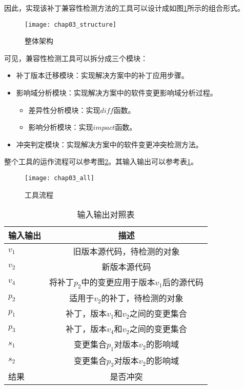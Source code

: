 因此，实现该补丁兼容性检测方法的工具可以设计成如图\ref {structure}所示的组合形式。

\begin{figure}[H]
	\centering
	\texttt{[image: chap03\_structure]}
	\caption {整体架构}	
	\label {structure}
\end{figure}

可见，兼容性检测工具可以拆分成三个模块：
\begin{itemize}
	\item 补丁版本迁移模块：实现解决方案中的补丁应用步骤。
	\item 影响域分析模块：实现解决方案中的软件变更影响域分析过程。
	\begin{itemize}
		\item 差异性分析模块：实现$diff$函数。
		\item 影响分析模块：实现$impact$函数。
	\end{itemize}
	\item 冲突判定模块：实现解决方案中的软件变更冲突检测方法。
\end{itemize}

整个工具的运作流程可以参考图\ref {solution_all}。其输入输出可以参考表\ref {all_io2}。

\begin{figure}[H]
	\centering
	\texttt{[image: chap03\_all]}
	\caption {工具流程}
	\label {solution_all}	
\end{figure}

\begin{table}[H]
	\caption{输入输出对照表}
	\label{all_io2}
	\centering
	\begin{tabular}{lc}
		\toprule[1.5pt]
		{\heiti 输入输出} & {\heiti 描述}\\\midrule[1pt]
		$v_1$ & 旧版本源代码，待检测的对象 \\
		$v_2$ & 新版本源代码 \\
		$v_4$ & 将补丁$p_2$中的变更应用于版本$v_1$后的源代码 \\
		$p_2$ & 适用于$v_2$的补丁，待检测的对象 \\
		$p_1$ & 补丁，版本$v_1$和$v_2$之间的变更集合\\
		$p_3$ & 补丁，版本$v_4$和$v_2$之间的变更集合\\
		$s_1$ & 变更集合$p_1$对版本$v_2$的影响域 \\
		$s_2$ & 变更集合$p_3$对版本$v_2$的影响域 \\
		结果 & 是否冲突\\
		\bottomrule[1.5pt]
	\end{tabular}
\end{table}

